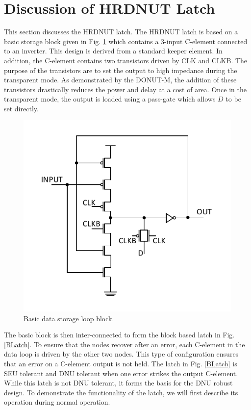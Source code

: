 \section{Discussion of HRDNUT Latch} \label{Proposed}

This section discusses the HRDNUT latch. The HRDNUT latch is based on a basic storage block given in Fig. \ref{Block} which contains a 3-input C-element connected to an inverter. This design is derived from a standard keeper element. In addition, the C-element contains two transistors driven by CLK and CLKB. The purpose of the transistors are to set the output to high impedance during the transparent mode. As demonstrated by the DONUT-M, the addition of these transistors drastically reduces the power and delay at a cost of area. Once in the transparent mode, the output is loaded using a pass-gate which allows $D$ to be set directly.     

\begin{figure}[h]
	\centering
	\includegraphics[width=0.5\linewidth]{Figures/Block}
	\caption{Basic data storage loop block.}
	\label{Block}
\end{figure} 

The basic block is then inter-connected to form the block based latch in Fig. \ref{BLatch}. To ensure that the nodes recover after an error, each C-element in the data loop is driven by the other two nodes. This type of configuration ensures that an error on a C-element output is not held. The latch in Fig. \ref{BLatch} is SEU tolerant and DNU tolerant when one error strikes the output C-element. While this latch is not DNU tolerant, it forms the basis for the DNU robust design. To demonstrate the functionality of the latch, we will first describe its operation during normal operation.

